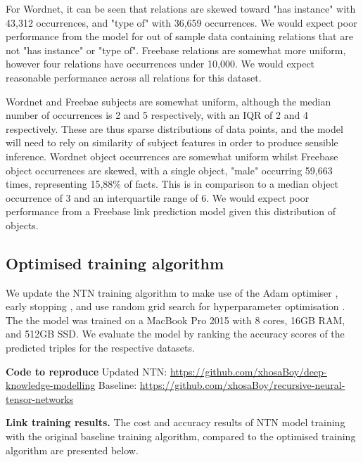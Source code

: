 \noindent For Wordnet, it can be seen that relations are skewed toward "has instance" with 43,312 occurrences, and "type of" with 36,659 occurrences. We would expect poor performance from the model for out of sample data containing relations that are not "has instance" or "type of". Freebase relations are somewhat more uniform, however four relations have occurrences under 10,000. We would expect reasonable performance across all relations for this dataset. \par

\noindent Wordnet and Freebae subjects are somewhat uniform, although the median number of occurrences is 2 and 5 respectively, with an IQR of 2 and 4 respectively. These are thus sparse distributions of data points, and the model will need to rely on  similarity of subject features in order to produce sensible inference. Wordnet object occurrences are somewhat uniform whilst Freebase object occurrences are skewed, with a single object, "male" occurring 59,663 times, representing 15,88\% of facts. This is in comparison to a median object occurrence of 3 and an interquartile range of 6. We would expect poor performance from a Freebase link prediction model given this distribution of objects. 



\subsection{Optimised training algorithm}

\noindent We update the NTN training algorithm to make use of the Adam optimiser \citep{kingma2014adam}, early stopping \citep{prechelt1998early}, and use random grid search for hyperparameter optimisation \citep{bergstra2012random}. The the model was trained on a MacBook Pro 2015 with 8 cores, 16GB RAM, and 512GB SSD. We evaluate the model by ranking the accuracy scores of the predicted triples for the respective datasets. \par

\noindent \textbf{Code to reproduce} \newline
Updated NTN:  \url{https://github.com/xhosaBoy/deep-knowledge-modelling} \newline
Baseline: \url{https://github.com/xhosaBoy/recursive-neural-tensor-networks}

\noindent \textbf{Link training results.} The cost and accuracy results of NTN model training with the original baseline training algorithm, compared to the optimised training algorithm are presented below.

